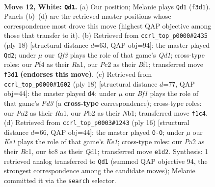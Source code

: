\documentclass[11pt]{article}
\begin{document}
\clearpage

\begin{figure}[p]\centering
\begin{subfigure}{0.46\textwidth}\centering
\resizebox{\linewidth}{!}{%
\newchessgame
\chessboard[
  setfen={rnbq1rk1/pp1n1ppp/2p1p3/3pP3/3P1P2/2N2Q2/PPP3PP/2R1KBNR w K - 0 12},
  showmover=false,
  pgfstyle=straightmove, color=movearrow, markmove={f3-d1}
]}
\caption{}
\end{subfigure}\hfill
\begin{subfigure}{0.46\textwidth}\centering
\resizebox{\linewidth}{!}{%
\newchessgame
\chessboard[
  setfen={rnb2rk1/pp1nqppp/4p3/1N1pP3/3p1P2/5N2/PPP3PP/R2QKB1R w KQ - 0 10},
  showmover=false,
  pgfstyle=straightmove, color=movearrow, markmove={d1-d2}
]}
\caption{}
\end{subfigure}
\\[4pt]
\begin{subfigure}{0.46\textwidth}\centering
\resizebox{\linewidth}{!}{%
\newchessgame
\chessboard[
  setfen={rn1q1rk1/pp2b1p1/2pppn1p/4p3/P3P3/3P1N1P/1PP2PP1/RNBQR1K1 w - - 0 10},
  showmover=false,
  pgfstyle=straightmove, color=movearrow, markmove={d3-d4}
]}
\caption{}
\end{subfigure}\hfill
\begin{subfigure}{0.46\textwidth}\centering
\resizebox{\linewidth}{!}{%
\newchessgame
\chessboard[
  setfen={rnbq1rk1/pp3pbp/2pp1np1/8/2PNP3/2N3P1/PP3PBP/R1BQK2R w KQ - 1 9},
  showmover=false,
  pgfstyle=straightmove, color=movearrow, markmove={e1-g1}
]}
\caption{}
\end{subfigure}
\caption{\textbf{Move 12, White: \texttt{Qd1}.} (a) Our position; Melanie plays \texttt{Qd1} (\texttt{f3d1}). Panels (b)--(d) are the retrieved master positions whose correspondence most drove this move (highest QAP objective among those that transfer to it). (b) Retrieved from \texttt{ccrl\_top\_p0000\#2435} (ply 18) [structural distance $d$=63, QAP obj=94]: the master played \texttt{Qd2}; under $\mu$ our \emph{Qf3} plays the role of that game's \emph{Qd1}; cross-type roles: our \emph{P}f4 as their \emph{R}a1, our \emph{P}c2 as their \emph{B}f1; transferred move \texttt{f3d1} \textbf{(endorses this move)}. (c) Retrieved from \texttt{ccrl\_top\_p0000\#1602} (ply 18) [structural distance $d$=77, QAP obj=44]: the master played \texttt{d4}; under $\mu$ our \emph{Bf1} plays the role of that game's \emph{Pd3} (a \textbf{cross-type} correspondence); cross-type roles: our \emph{P}a2 as their \emph{R}a1, our \emph{P}b2 as their \emph{N}b1; transferred move \texttt{f1c4}. (d) Retrieved from \texttt{ccrl\_top\_p0003\#1243} (ply 16) [structural distance $d$=66, QAP obj=44]: the master played \texttt{O-O}; under $\mu$ our \emph{Ke1} plays the role of that game's \emph{Ke1}; cross-type roles: our \emph{P}a2 as their \emph{B}c1, our \emph{b}c8 as their \emph{Q}d1; transferred move \texttt{e1d2}. Synthesis: 1 retrieved analog transferred to \texttt{Qd1} (summed QAP objective 94, the strongest correspondence among the candidate moves); Melanie committed it via the \texttt{search} selector.}
\label{fig:thought-m22}
\end{figure}
\end{document}
